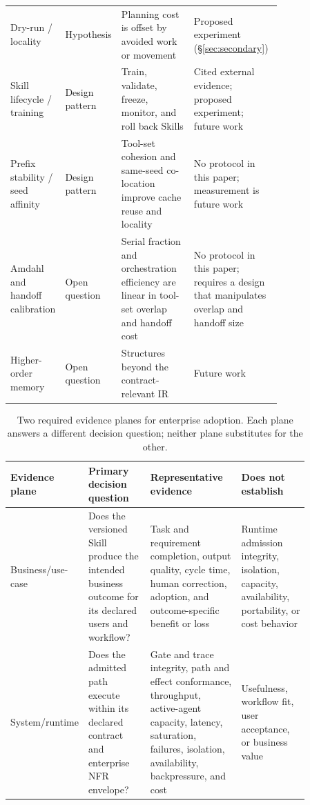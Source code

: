 \begin{table}[t]
\begin{tabular}{lp{0.14\linewidth}p{0.30\linewidth}p{0.34\linewidth}}
Dry-run / locality & Hypothesis & Planning cost is offset by avoided work or movement & Proposed experiment (\S\ref{sec:secondary}) \\
Skill lifecycle / training & Design pattern & Train, validate, freeze, monitor, and roll back Skills & Cited external evidence; proposed experiment; future work \\
Prefix stability / seed affinity & Design pattern & Tool-set cohesion and same-seed co-location improve cache reuse and locality & No protocol in this paper; measurement is future work \\
Amdahl and handoff calibration & Open question & Serial fraction and orchestration efficiency are linear in tool-set overlap and handoff cost & No protocol in this paper; requires a design that manipulates overlap and handoff size \\
Higher-order memory & Open question & Structures beyond the contract-relevant IR & Future work \\
\hline
\end{tabular}
\end{table}

\begin{table}[t]
\centering
\caption{Two required evidence planes for enterprise adoption. Each plane answers a different decision question; neither plane substitutes for the other.}
\label{tab:evidence-planes}
\begin{tabular}{lp{0.25\linewidth}p{0.34\linewidth}p{0.27\linewidth}}
\hline
Evidence plane & Primary decision question & Representative evidence & Does not establish \\
\hline
Business/use-case & Does the versioned Skill produce the intended business outcome for its declared users and workflow? & Task and requirement completion, output quality, cycle time, human correction, adoption, and outcome-specific benefit or loss & Runtime admission integrity, isolation, capacity, availability, portability, or cost behavior \\
System/runtime & Does the admitted path execute within its declared contract and enterprise NFR envelope? & Gate and trace integrity, path and effect conformance, throughput, active-agent capacity, latency, saturation, failures, isolation, availability, backpressure, and cost & Usefulness, workflow fit, user acceptance, or business value \\
\hline
\end{tabular}
\end{table}

